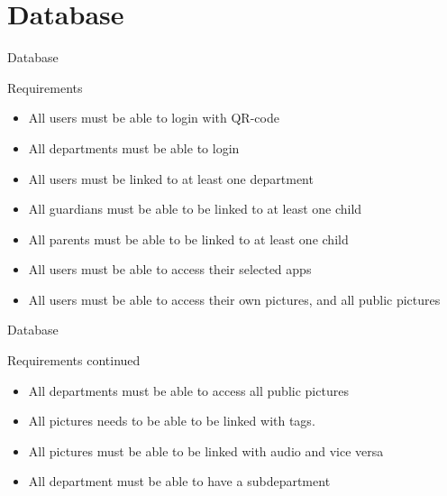 \section{Database}
\begin{frame}{Database}
\pause
    \begin{block}{Requirements}
        \begin{itemize}
					\pause \item All users must be able to login with QR-code
					\pause \item All departments must be able to login
					\pause \item All users must be linked to at least one department
					\pause \item All guardians must be able to be linked to at least one child
					\pause \item All parents must be able to be linked to at least one child
					\pause \item All users must be able to access their selected apps
					\pause \item All users must be able to access their own pictures, and all public pictures
				\end{itemize}
    \end{block}
\end{frame}
\begin{frame}{Database}
    \begin{block}{Requirements continued}
        \begin{itemize}
					\pause \item All departments must be able to access all public pictures
					\pause \item All pictures needs to be able to be linked with tags.
					\pause \item All pictures must be able to be linked with audio and vice versa
					\pause \item All department must be able to have a subdepartment
				\end{itemize}
    \end{block}
\end{frame}

